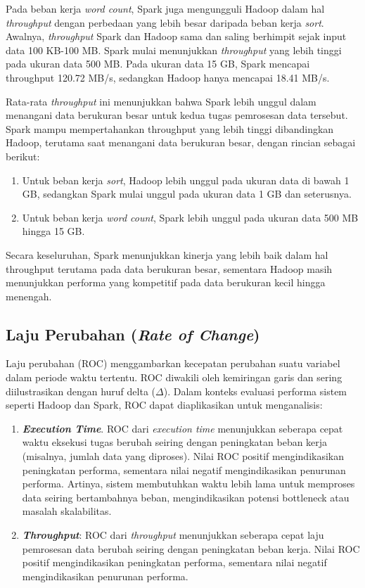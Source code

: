 Pada beban kerja \textit{word count}, Spark juga mengungguli Hadoop dalam hal \textit{throughput} dengan perbedaan yang lebih besar daripada beban kerja \textit{sort}. Awalnya, \textit{throughput} Spark dan Hadoop sama dan saling berhimpit sejak input data 100 KB-100 MB. Spark mulai menunjukkan \textit{throughput} yang lebih tinggi pada ukuran data 500 MB. Pada ukuran data 15 GB, Spark mencapai throughput 120.72 MB/s, sedangkan Hadoop hanya mencapai 18.41 MB/s.

Rata-rata \textit{throughput} ini menunjukkan bahwa Spark lebih unggul dalam menangani data berukuran besar untuk kedua tugas pemrosesan data tersebut. Spark mampu mempertahankan throughput yang lebih tinggi dibandingkan Hadoop, terutama saat menangani data berukuran besar, dengan rincian sebagai berikut:
\begin{enumerate}
\item Untuk beban kerja \textit{sort}, Hadoop lebih unggul pada ukuran data di bawah 1 GB, sedangkan Spark mulai unggul pada ukuran data 1 GB dan seterusnya.
\item Untuk beban kerja \textit{word count}, Spark lebih unggul pada ukuran data 500 MB hingga 15 GB.
\end{enumerate}

Secara keseluruhan, Spark menunjukkan kinerja yang lebih baik dalam hal throughput terutama pada data berukuran besar, sementara Hadoop masih menunjukkan performa yang kompetitif pada data berukuran kecil hingga menengah.


\newpage
\subsection{Laju Perubahan (\textit{Rate of Change})}

Laju perubahan (ROC) menggambarkan kecepatan perubahan suatu variabel dalam periode waktu tertentu. ROC diwakili oleh kemiringan garis dan sering diilustrasikan dengan huruf delta ($\Delta$). Dalam konteks evaluasi performa sistem seperti Hadoop dan Spark, ROC dapat diaplikasikan untuk menganalisis:
\begin{enumerate}
	\item \textit{\textbf{Execution Time}}. ROC dari \textit{execution time} menunjukkan seberapa cepat waktu eksekusi tugas berubah seiring dengan peningkatan beban kerja (misalnya, jumlah data yang diproses). Nilai ROC positif mengindikasikan peningkatan performa, sementara nilai negatif mengindikasikan penurunan performa. Artinya, sistem membutuhkan waktu lebih lama untuk memproses data seiring bertambahnya beban, mengindikasikan potensi bottleneck atau masalah skalabilitas.
	\item \textit{\textbf{Throughput}}: ROC dari \textit{throughput} menunjukkan seberapa cepat laju pemrosesan data berubah seiring dengan peningkatan beban kerja. Nilai ROC positif mengindikasikan peningkatan performa, sementara nilai negatif mengindikasikan penurunan performa.\\
\end{enumerate}


